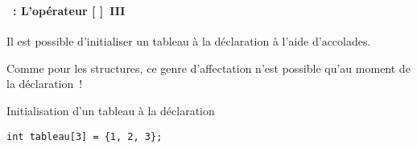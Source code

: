 \begin{frame}[containsverbatim]
  \frametitle{\secname}
  \framesubtitle{\subsecname~: L'opérateur [ ]~III}

  Il est possible d'initialiser un tableau à la déclaration à l'aide d'accolades.
  \vspace{0.5cm}
  \par
  Comme pour les structures, ce genre d'affectation n'est possible qu'au moment de la déclaration~!
  \vspace{0.5cm}  
  \begin{exampleblock}{Initialisation d'un tableau à la déclaration}
    \begin{verbatim}
int tableau[3] = {1, 2, 3};\end{verbatim}
  \end{exampleblock}
\end{frame}

